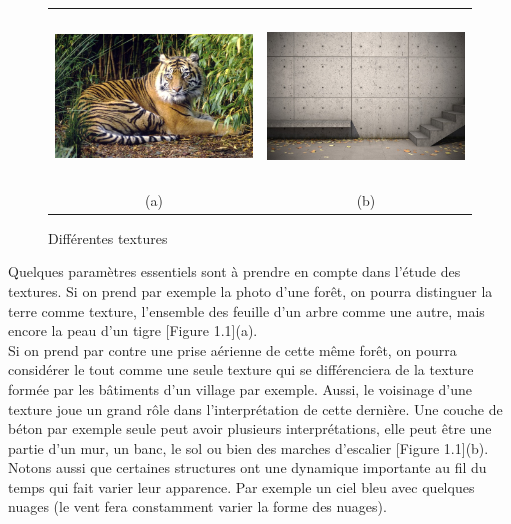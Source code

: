 \begin{figure}[htbp]
\centering
\begin{tabular}{cc}
\centering
\includegraphics[width=6cm, height=4.5cm]{Figures/chap1/tigre.jpg}
&
\includegraphics[width=6cm, height=4.5cm]{Figures/chap1/beton.jpg}\\

(a)
 &
(b)

\end{tabular}
\caption[textureDif]{Différentes textures\\}
\end{figure}


Quelques paramètres essentiels sont à prendre en compte dans l’étude des textures. Si on prend par exemple la photo d’une forêt, on pourra distinguer la terre comme texture,  l’ensemble des feuille d’un arbre comme une autre, mais encore la peau d’un tigre [Figure 1.1](a).\\

Si on prend par contre une prise aérienne de cette même forêt, on pourra considérer le tout comme une seule texture qui se différenciera de la texture formée par les bâtiments d’un village par exemple. 
Aussi, le voisinage d’une texture joue un grand rôle dans l’interprétation de cette dernière. Une couche de béton par exemple seule peut avoir plusieurs interprétations, elle peut être une partie d’un mur,  un banc, le sol ou  bien des marches d’escalier [Figure 1.1](b).\\

Notons aussi que certaines structures ont une dynamique importante au fil du temps qui fait varier leur apparence. Par exemple un ciel bleu avec quelques nuages (le vent fera constamment varier la forme des nuages).\\ 

